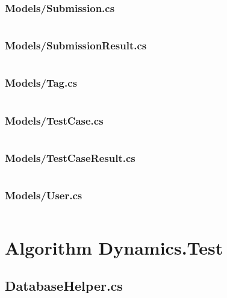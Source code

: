 \documentclass[a4paper]{report}
\begin{document}
\inputminted{csharp}{"../src/Algorithm Dynamics.Core/Models/StatusCode.cs"}

\subsubsection{Models/Submission.cs}

\inputminted{csharp}{"../src/Algorithm Dynamics.Core/Models/Submission.cs"}

\subsubsection{Models/SubmissionResult.cs}

\inputminted{csharp}{"../src/Algorithm Dynamics.Core/Models/SubmissionResult.cs"}

\subsubsection{Models/Tag.cs}

\inputminted{csharp}{"../src/Algorithm Dynamics.Core/Models/Tag.cs"}

\subsubsection{Models/TestCase.cs}

\inputminted{csharp}{"../src/Algorithm Dynamics.Core/Models/TestCase.cs"}

\subsubsection{Models/TestCaseResult.cs}

\inputminted{csharp}{"../src/Algorithm Dynamics.Core/Models/TestCaseResult.cs"}

\subsubsection{Models/User.cs}

\inputminted{csharp}{"../src/Algorithm Dynamics.Core/Models/User.cs"}

\section{Algorithm Dynamics.Test}

\subsection{DatabaseHelper.cs}
\end{document}

